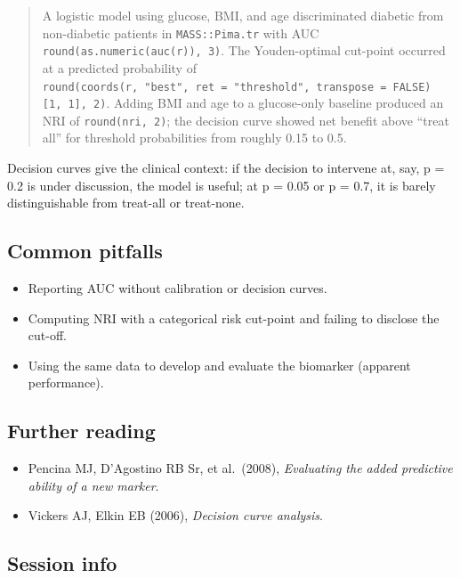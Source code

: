 \documentclass[
]{article}
\providecommand{\tightlist}{%
  \setlength{\itemsep}{0pt}\setlength{\parskip}{0pt}}
\begin{document}
\begin{quote}
A logistic model using glucose, BMI, and age discriminated diabetic from
non-diabetic patients in \texttt{MASS::Pima.tr} with AUC
\texttt{round(as.numeric(auc(r)),\ 3)}. The Youden-optimal cut-point
occurred at a predicted probability of
\texttt{round(coords(r,\ "best",\ ret\ =\ "threshold",\ transpose\ =\ FALSE){[}1,\ 1{]},\ 2)}.
Adding BMI and age to a glucose-only baseline produced an NRI of
\texttt{round(nri,\ 2)}; the decision curve showed net benefit above
``treat all'' for threshold probabilities from roughly 0.15 to 0.5.
\end{quote}

Decision curves give the clinical context: if the decision to intervene
at, say, p = 0.2 is under discussion, the model is useful; at p = 0.05
or p = 0.7, it is barely distinguishable from treat-all or treat-none.

\subsection{Common pitfalls}\label{common-pitfalls}

\begin{itemize}
\tightlist
\item
  Reporting AUC without calibration or decision curves.
\item
  Computing NRI with a categorical risk cut-point and failing to
  disclose the cut-off.
\item
  Using the same data to develop and evaluate the biomarker (apparent
  performance).
\end{itemize}

\subsection{Further reading}\label{further-reading}

\begin{itemize}
\tightlist
\item
  Pencina MJ, D'Agostino RB Sr, et al.~(2008), \emph{Evaluating the
  added predictive ability of a new marker}.
\item
  Vickers AJ, Elkin EB (2006), \emph{Decision curve analysis}.
\end{itemize}

\subsection{Session info}\label{session-info}
\end{document}
